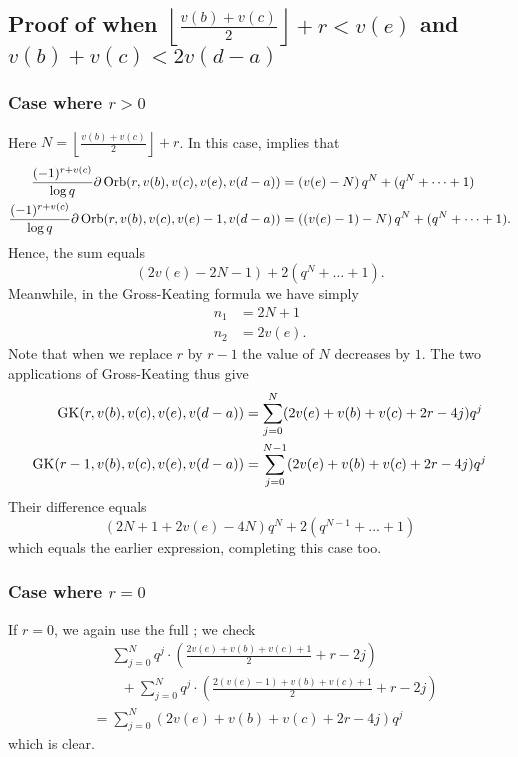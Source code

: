 \subsection{Proof of 
  when $\left\lfloor \tfrac{v(b)+v(c)}{2} \right\rfloor + r < v(e)$
  and $v(b)+v(c) < 2v(d-a)$}
\subsubsection{Case where $r > 0$}
Here $N = \left\lfloor \tfrac{v(b)+v(c)}{2} \right\rfloor + r$.
In this case,  implies that
\begin{align*}
  \frac{(-1)^{r+v(c)}}{\log q}\partial\operatorname{Orb}(r, v(b), v(c), v(e), v(d-a))
  &= \left( v(e) - N \right) q^{N} + (q^N + \dots + 1) \\
  \frac{(-1)^{r+v(c)}}{\log q}\partial\operatorname{Orb}(r, v(b), v(c), v(e)-1, v(d-a))
  &= \left( (v(e) - 1) - N \right) q^{N} + (q^N + \dots + 1).
\end{align*}
Hence, the sum equals
\[ \left( 2v(e) - 2N - 1 \right) + 2(q^N + \dots + 1). \]
Meanwhile, in the Gross-Keating formula we have simply
\begin{align*}
  n_1 &= 2N+1 \\
  n_2 &= 2v(e).
\end{align*}
Note that when we replace $r$ by $r-1$ the value of $N$ decreases by $1$.
The two applications of Gross-Keating thus give
\begin{align*}
  \operatorname{GK}(r, v(b), v(c), v(e), v(d-a))
  &= \sum_{j=0}^N (2v(e)+v(b)+v(c)+2r-4j) q^j \\
  \operatorname{GK}(r-1, v(b), v(c), v(e), v(d-a))
  &= \sum_{j=0}^{N-1} (2v(e)+v(b)+v(c)+2r-4j) q^j \\
\end{align*}
Their difference equals
\[ (2N+1+2v(e)-4N) q^{N} + 2(q^{N-1} + \dots + 1) \]
which equals the earlier expression, completing this case too.
\subsubsection{Case where $r = 0$}
If $r = 0$, we again use the full ; we check
\begin{align*}
  &\phantom= \sum_{j=0}^{N} q^j \cdot \left( \frac{2v(e)+v(b)+v(c)+1}{2} + r - 2j \right) \\
  &\qquad+ \sum_{j=0}^{N} q^j \cdot \left( \frac{2(v(e)-1)+v(b)+v(c)+1}{2} + r - 2j \right) \\
  &= \sum_{j=0}^N (2v(e)+v(b)+v(c)+2r-4j) q^j
\end{align*}
which is clear.

